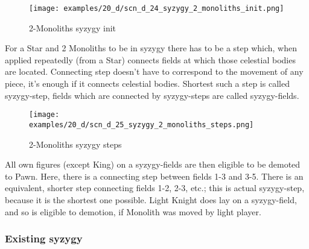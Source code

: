 \vspace*{-1.4\baselineskip}
\noindent
\begin{figure}[!h]
\texttt{[image: examples/20\_d/scn\_d\_24\_syzygy\_2\_monoliths\_init.png]}
\vspace*{-1.3\baselineskip}
\caption{2-Monoliths syzygy init}
\label{fig:scn_d_24_syzygy_2_monoliths_init}
\end{figure}

\vspace*{-0.4\baselineskip}
For a Star and 2 Monoliths to be in syzygy there has to be a step which, when applied
repeatedly (from a Star) connects fields at which those celestial bodies are located.
Connecting step doesn't have to correspond to the movement of any piece, it's enough
if it connects celestial bodies. Shortest such a step is called syzygy-step, fields
which are connected by syzygy-steps are called syzygy-fields.

\clearpage %

\vspace*{-2.3\baselineskip}
\noindent
\begin{figure}[!h]
\texttt{[image: examples/20\_d/scn\_d\_25\_syzygy\_2\_monoliths\_steps.png]}
\vspace*{-1.3\baselineskip}
\caption{2-Monoliths syzygy steps}
\label{fig:scn_d_25_syzygy_2_monoliths_steps}
\end{figure}

\vspace*{-0.4\baselineskip}
All own figures (except King) on a syzygy-fields are then eligible to be demoted
to Pawn. Here, there is a connecting step between fields 1-3 and 3-5. There is an
equivalent, shorter step connecting fields 1-2, 2-3, etc.; this is actual syzygy-step,
because it is the shortest one possible. Light Knight does lay on a syzygy-field, and
so is eligible to demotion, if Monolith was moved by light player.

\clearpage %

\subsubsection*{Existing syzygy}
\label{sec:Discovery/Monolith/Syzygy/Existing syzygy}

